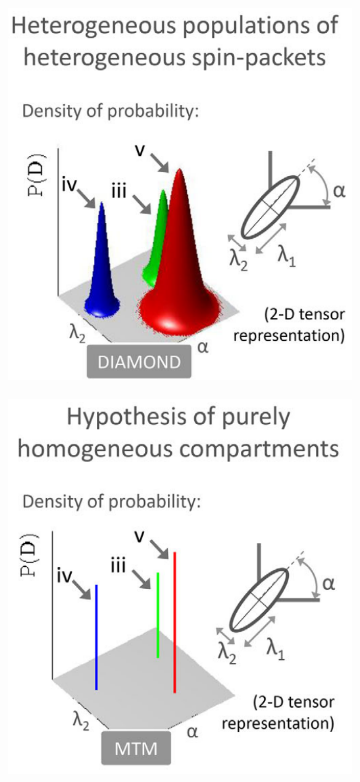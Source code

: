  \begin{figure}[h]
   \centering
   \begin{subfigure}{.32\textwidth}
      \centering
      \includegraphics[width=\textwidth]{images/diamond1.png}
      \caption{}
      \label{fig:multicompartment}
   \end{subfigure}
   \begin{subfigure}{.32\textwidth}
      \centering
      \includegraphics[width=\textwidth]{images/diamond2.png}

\end{subfigure}
\end{figure}
